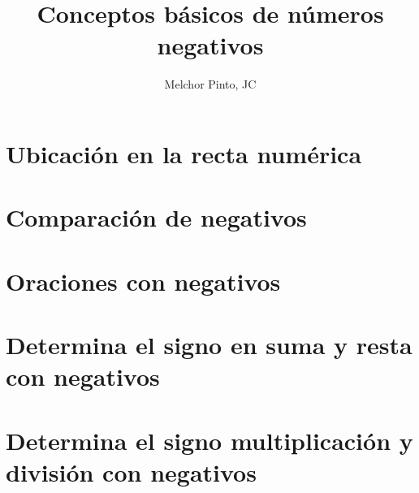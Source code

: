 \documentclass{guia}
\title{Conceptos básicos de números negativos}
\author{Melchor Pinto, JC}
\begin{document}
\INFO%
\begin{questions}
\section{Ubicación en la recta numérica}
\questionboxed{}
\section{Comparación de negativos}
\questionboxed{}
\section{Oraciones con negativos}
\questionboxed{}
\section{Determina el signo en suma y resta con negativos}
\questionboxed{}
\section{Determina el signo multiplicación y división con negativos}
\questionboxed{}

\end{questions}
\end{document}
